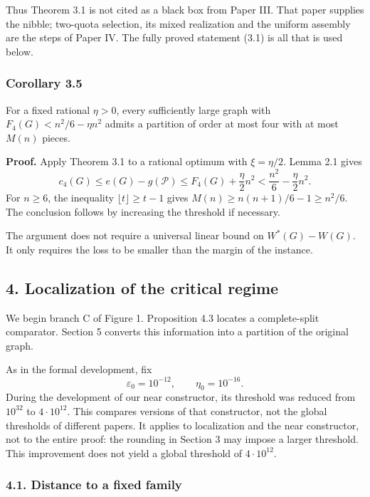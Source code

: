 \documentclass[english,11pt,a4paper]{article}
\begin{document}
Thus Theorem 3.1 is not cited as a black box from Paper III. That paper supplies the nibble; two-quota selection, its mixed realization and the uniform assembly are the steps of Paper IV. The fully proved statement (3.1) is all that is used below.

\subsubsection{Corollary 3.5}\label{corollary-3.5}

For a fixed rational \(\eta>0\), every sufficiently large graph with \(F_4(G)<n^2/6-\eta n^2\) admits a partition of order at most four with at most \(M(n)\) pieces.

\textbf{Proof.} Apply Theorem 3.1 to a rational optimum with \(\xi=\eta/2\). Lemma 2.1 gives \[
c_4(G)\le e(G)-g(\mathcal P)
\le F_4(G)+\frac\eta2n^2
<\frac{n^2}{6}-\frac\eta2n^2.
\] For \(n\ge6\), the inequality \(\lfloor t\rfloor\ge t-1\) gives \(M(n)\ge n(n+1)/6-1\ge n^2/6\). The conclusion follows by increasing the threshold if necessary.

The argument does not require a universal linear bound on \(W^*(G)-W(G)\). It only requires the loss to be smaller than the margin of the instance.

\subsection{4. Localization of the critical regime}\label{localization-of-the-critical-regime}

We begin branch C of Figure 1. Proposition 4.3 locates a complete-split comparator. Section 5 converts this information into a partition of the original graph.

As in the formal development, fix \[
\varepsilon_0=10^{-12},\qquad \eta_0=10^{-16}.
\tag{4.1}
\] During the development of our near constructor, its threshold was reduced from \(10^{32}\) to \(4\cdot10^{12}\). This compares versions of that constructor, not the global thresholds of different papers. It applies to localization and the near constructor, not to the entire proof: the rounding in Section 3 may impose a larger threshold. This improvement does not yield a global threshold of \(4\cdot10^{12}\).

\subsubsection{4.1. Distance to a fixed family}\label{distance-to-a-fixed-family}
\end{document}
